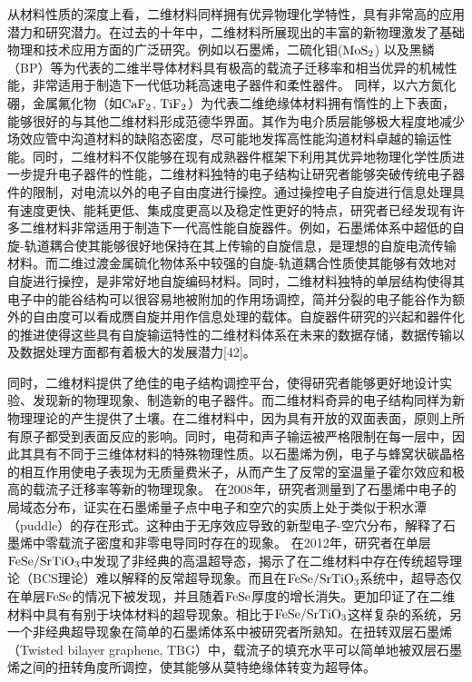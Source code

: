     从材料性质的深度上看，二维材料同样拥有优异物理化学特性，具有非常高的应用潜力和研究潜力。在过去的十年中，二维材料所展现出的丰富的新物理激发了基础物理和技术应用方面的广泛研究。例如以石墨烯，二硫化钼($\rm{MoS_{2}}$) 以及黑鳞（BP）等为代表的二维半导体材料具有极高的载流子迁移率和相当优异的机械性能，非常适用于制造下一代低功耗高速电子器件和柔性器件。%
    同样，以六方氮化硼，金属氟化物（如$\rm{CaF_{2}}$, $\rm{TiF_{2}}$）为代表二维绝缘体材料拥有惰性的上下表面，能够很好的与其他二维材料形成范德华界面。其作为电介质层能够极大程度地减少场效应管中沟道材料的缺陷态密度，尽可能地发挥高性能沟道材料卓越的输运性能。同时，二维材料不仅能够在现有成熟器件框架下利用其优异地物理化学性质进一步提升电子器件的性能，二维材料独特的电子结构让研究者能够突破传统电子器件的限制，对电流以外的电子自由度进行操控。通过操控电子自旋进行信息处理具有速度更快、能耗更低、集成度更高以及稳定性更好的特点，研究者已经发现有许多二维材料非常适用于制造下一代高性能自旋器件。例如，石墨烯体系中超低的自旋-轨道耦合使其能够很好地保持在其上传输的自旋信息，是理想的自旋电流传输材料。而二维过渡金属硫化物体系中较强的自旋-轨道耦合性质使其能够有效地对自旋进行操控，是非常好地自旋编码材料。同时，二维材料独特的单层结构使得其电子中的能谷结构可以很容易地被附加的作用场调控，简并分裂的电子能谷作为额外的自由度可以看成赝自旋并用作信息处理的载体。自旋器件研究的兴起和器件化的推进使得这些具有自旋输运特性的二维材料体系在未来的数据存储，数据传输以及数据处理方面都有着极大的发展潜力[42]。%

    同时，二维材料提供了绝佳的电子结构调控平台，使得研究者能够更好地设计实验、发现新的物理现象、制造新的电子器件。而二维材料奇异的电子结构同样为新物理理论的产生提供了土壤。在二维材料中，因为具有开放的双面表面，原则上所有原子都受到表面反应的影响。同时，电荷和声子输运被严格限制在每一层中，因此其具有不同于三维体材料的特殊物理性质。以石墨烯为例，电子与蜂窝状碳晶格的相互作用使电子表现为无质量费米子，从而产生了反常的室温量子霍尔效应和极高的载流子迁移率等新的物理现象。%
    在2008年，研究者测量到了石墨烯中电子的局域态分布，证实在石墨烯量子点中电子和空穴的实质上处于类似于积水潭（puddle）的存在形式。这种由于无序效应导致的新型电子-空穴分布，解释了石墨烯中零载流子密度和非零电导同时存在的现象。%
    在2012年，研究者在单层$\rm{FeSe/SrTiO_{3}}$中发现了非经典的高温超导态，揭示了在二维材料中存在传统超导理论（BCS理论）难以解释的反常超导现象。而且在$\rm{FeSe/SrTiO_{3}}$系统中，超导态仅在单层$\rm{FeSe}$的情况下被发现，并且随着$\rm{FeSe}$厚度的增长消失。更加印证了在二维材料中具有有别于块体材料的超导现象。相比于$\rm{FeSe/SrTiO_{3}}$这样复杂的系统，另一个非经典超导现象在简单的石墨烯体系中被研究者所熟知。在扭转双层石墨烯（Twisted bilayer graphene, TBG）中，载流子的填充水平可以简单地被双层石墨烯之间的扭转角度所调控，使其能够从莫特绝缘体转变为超导体。

